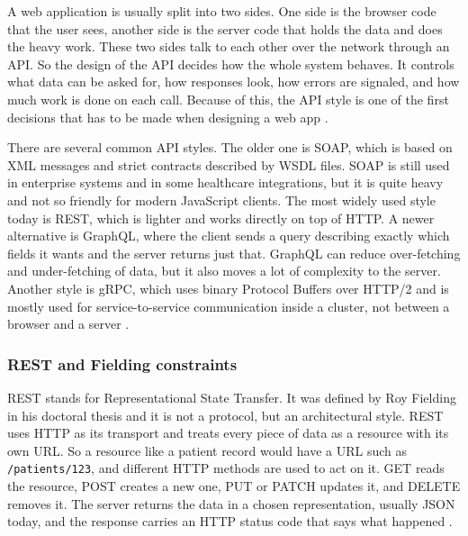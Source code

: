 A web application is usually split into two sides. One side is the browser code that the user sees, another side is the server code that holds the data and does the heavy work. These two sides talk to each other over the network through an API. So the design of the API decides how the whole system behaves. It controls what data can be asked for, how responses look, how errors are signaled, and how much work is done on each call. Because of this, the API style is one of the first decisions that has to be made when designing a web app \autocite{addanki2025api_shifts, marchuk2023db_access}.

There are several common API styles. The older one is SOAP, which is based on XML messages and strict contracts described by WSDL files. SOAP is still used in enterprise systems and in some healthcare integrations, but it is quite heavy and not so friendly for modern JavaScript clients. The most widely used style today is REST, which is lighter and works directly on top of HTTP. A newer alternative is GraphQL, where the client sends a query describing exactly which fields it wants and the server returns just that. GraphQL can reduce over-fetching and under-fetching of data, but it also moves a lot of complexity to the server. Another style is gRPC, which uses binary Protocol Buffers over HTTP/2 and is mostly used for service-to-service communication inside a cluster, not between a browser and a server \autocite{addanki2025api_shifts, sadaf2024rest_graphql, toman2020rest_soap, stepien2025rest_graphql, brito2020rest_graphql}.

\subsubsection{REST and Fielding constraints}
\label{sec:rest-constraints}

REST stands for Representational State Transfer. It was defined by Roy Fielding in his doctoral thesis and it is not a protocol, but an architectural style. REST uses HTTP as its transport and treats every piece of data as a resource with its own URL. So a resource like a patient record would have a URL such as \texttt{/patients/123}, and different HTTP methods are used to act on it. GET reads the resource, POST creates a new one, PUT or PATCH updates it, and DELETE removes it. The server returns the data in a chosen representation, usually JSON today, and the response carries an HTTP status code that says what happened \autocite{toman2020rest_soap, koziel2020rest_auth_security}.

